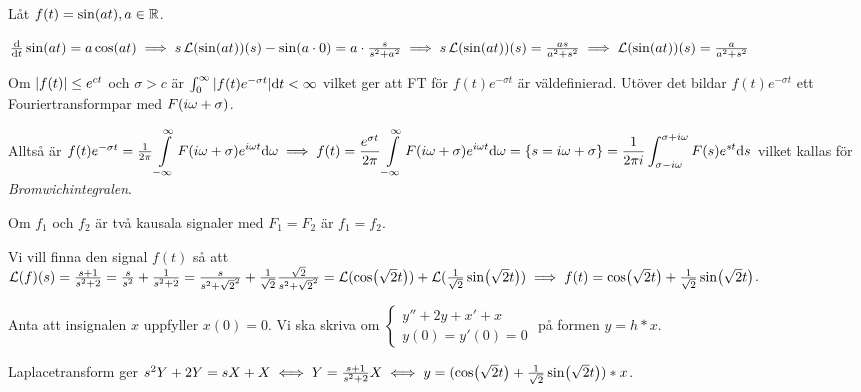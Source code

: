 \documentclass[a4paper]{article}
\begin{document}
\begin{ex}
    Låt \(
        f(t) = \sin(at), a \in \mathbb{R}
    \). 

    \(
        \dv{t} \sin(at) = a \cos(at)
            \implies s \operatorname{\mathcal{L}}(\sin(at))(s) - \sin(a\cdot 0) 
                = a \cdot \frac{s}{s^2+a^2} 
            \implies s \operatorname{\mathcal{L}}(\sin(at))(s) = \frac{as}{a^2+s^2}
            \implies \operatorname{\mathcal{L}}(\sin(at))(s) = \frac{a}{a^2+s^2} 
    \) 
\end{ex}

Om \(
    \abs{f(t)} \leq e^{ct} 
\) och \(
    \sigma > c
\) är \(
    \int_0^\infty \abs{f(t) e^{-\sigma t}} \dd t < \infty
\) vilket ger att FT för \(
    f(t) e^{-\sigma t}
\) är väldefinierad. Utöver det bildar \(
    f(t) e^{-\sigma t}
\) ett Fouriertransformpar med \(
    F(i\omega + \sigma)
\).

Alltså är \(
    f(t) e^{-\sigma t} = \frac{1}{2\pi} \displaystyle\int\limits_{-\infty}^{\infty} F(i\omega + \sigma) e^{i\omega t} \dd \omega
        \implies f(t) = \frac{ e^{\sigma t} }{2\pi} \displaystyle\int\limits_{-\infty}^{\infty} F(i\omega + \sigma) e^{i\omega t} \dd \omega
        = \{s = i\omega + \sigma\}
        = \frac{1}{2\pi i} \int_{\sigma-i\omega}^{\sigma+i\omega} F(s) e^{st} \dd s
\) vilket kallas för \emph{Bromwichintegralen}.

\begin{sats}
    Om \(
        f_1 
    \) och \(
        f_2
    \) är två kausala signaler med \(
        F_1 = F_2 
    \) är \(
        f_1 = f_2
    \).
\end{sats}

\begin{ex}
    Vi vill finna den signal \(
        f(t)
    \) så att \(
        \operatorname{\mathcal{L}}(f)(s) = \frac{s+1}{s^2+2} 
            = \frac{s}{s^2} + \frac{1}{s^2+2} 
            = \frac{s}{s^2+{\sqrt{2}}^2} + \frac{1}{\sqrt{2}} \frac{\sqrt{2}}{s^2 + {\sqrt{2}}^2}
            = \operatorname{\mathcal{L}}(\cos(\sqrt{2} t)) + \operatorname{\mathcal{L}}(\frac{1}{\sqrt{2}} \sin(\sqrt{2} t)) 
            \implies f(t) = \cos(\sqrt{2} t) + \frac{1}{\sqrt{2}} \sin(\sqrt{2} t)
    \).
\end{ex}

\begin{ex}
    Anta att insignalen \(
        x
    \) uppfyller \(
        x(0) = 0
    \). Vi ska skriva om \(
        \left\{\begin{matrix}
            y'' + 2y + x'+x \\ 
            y(0) = y'(0) = 0
        \end{matrix}\right.
    \) på formen \(
        y = h*x
    \).

    Laplacetransform ger \(
        s^2 Y + 2Y = sX + X
        \iff
        Y = \frac{s+1}{s^2+2} X
        \iff 
        y = (\cos(\sqrt{2} t) + \frac{1}{\sqrt{2}} \sin(\sqrt{2} t)) * x
    \).
\end{ex}
\end{document}
